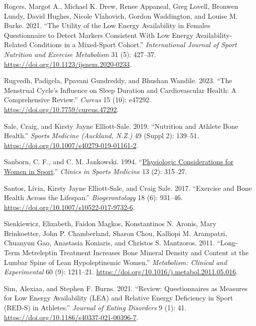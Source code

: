 \documentclass[
]{article}
\newlength{\cslhangindent}
\newenvironment{CSLReferences}[2] %
 {\begin{list}{}{%
  \setlength{\itemindent}{0pt}
  \setlength{\leftmargin}{0pt}
  \setlength{\parsep}{0pt}
  \ifodd #1
   \setlength{\leftmargin}{\cslhangindent}
   \setlength{\itemindent}{-1\cslhangindent}
  \fi
  \setlength{\itemsep}{#2\baselineskip}}}
 {\end{list}}
\begin{document}
\begin{CSLReferences}{1}{0}
Rogers, Margot A., Michael K. Drew, Renee Appaneal, Greg Lovell, Bronwen Lundy, David Hughes, Nicole Vlahovich, Gordon Waddington, and Louise M. Burke. 2021. {``The {Utility} of the {Low} {Energy} {Availability} in {Females} {Questionnaire} to {Detect} {Markers} {Consistent} {With} {Low} {Energy} {Availability}-{Related} {Conditions} in a {Mixed}-{Sport} {Cohort}.''} \emph{International Journal of Sport Nutrition and Exercise Metabolism} 31 (5): 427--37. \url{https://doi.org/10.1123/ijsnem.2020-0233}.

Rugvedh, Padigela, Ppavani Gundreddy, and Bhushan Wandile. 2023. {``The {Menstrual} {Cycle}'s {Influence} on {Sleep} {Duration} and {Cardiovascular} {Health}: {A} {Comprehensive} {Review}.''} \emph{Cureus} 15 (10): e47292. \url{https://doi.org/10.7759/cureus.47292}.

Sale, Craig, and Kirsty Jayne Elliott-Sale. 2019. {``Nutrition and {Athlete} {Bone} {Health}.''} \emph{Sports Medicine (Auckland, N.Z.)} 49 (Suppl 2): 139--51. \url{https://doi.org/10.1007/s40279-019-01161-2}.

Sanborn, C. F., and C. M. Jankowski. 1994. {``\href{https://www.ncbi.nlm.nih.gov/pubmed/8013035}{Physiologic Considerations for Women in Sport}.''} \emph{Clinics in Sports Medicine} 13 (2): 315--27.

Santos, Lívia, Kirsty Jayne Elliott-Sale, and Craig Sale. 2017. {``Exercise and Bone Health Across the Lifespan.''} \emph{Biogerontology} 18 (6): 931--46. \url{https://doi.org/10.1007/s10522-017-9732-6}.

Sienkiewicz, Elizabeth, Faidon Magkos, Konstantinos N. Aronis, Mary Brinkoetter, John P. Chamberland, Sharon Chou, Kalliopi M. Arampatzi, Chuanyun Gao, Anastasia Koniaris, and Christos S. Mantzoros. 2011. {``Long-Term Metreleptin Treatment Increases Bone Mineral Density and Content at the Lumbar Spine of Lean Hypoleptinemic Women.''} \emph{Metabolism: Clinical and Experimental} 60 (9): 1211--21. \url{https://doi.org/10.1016/j.metabol.2011.05.016}.

Sim, Alexiaa, and Stephen F. Burns. 2021. {``Review: Questionnaires as Measures for Low Energy Availability ({LEA}) and Relative Energy Deficiency in Sport ({RED}-{S}) in Athletes.''} \emph{Journal of Eating Disorders} 9 (1): 41. \url{https://doi.org/10.1186/s40337-021-00396-7}.


\end{CSLReferences}
\end{document}
